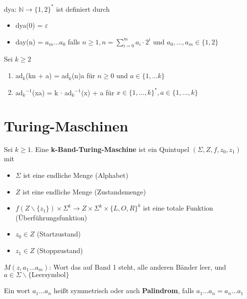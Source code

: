 \documentclass[14pt]{article}
\begin{document}
        \begin{definition}
            dya: $\mathbb{N} \rightarrow \{ 1, 2\}^*$ ist definiert durch
            \begin{itemize}
                \item dya(0) = $\varepsilon$
                \item day(n) = $a_m \dots a_0$ falls $n \geq 1, n = \sum_{i = 0}^m
                a_i \cdot 2^i$ und $a_0, \dots, a_m \in \{ 1, 2 \}$
            \end{itemize}
        \end{definition}
        
        \begin{eigenschaft}
            Sei $k \geq 2$
            \begin{enumerate}
                \item ad$_k$(kn + a) = ad$_k$(n)a für $n \geq 0$ und $a \in \{ 1, \dots k\}$
                \item ad$_k$$^{-1}$(xa) = k $\cdot$ ad$_k$$^{-1}$(x) + a
                für $x \in \{ 1, \dots, k\}^*, a \in \{ 1, \dots, k \}$
            \end{enumerate}
        \end{eigenschaft}

    \section{Turing-Maschinen}
        \begin{definition}
            Sei $k \geq 1$. Eine \textbf{k-Band-Turing-Maschine} ist 
            ein Quintupel $(\varSigma, Z, f, z_0, z_1)$ mit 
            \begin{itemize}
                \item $\varSigma$ ist eine endliche Menge (Alphabet)
                \item $Z$ ist eine endliche Menge (Zustandsmenge)
                \item $f(Z \backslash \{ z_1\}) \times \varSigma^k \rightarrow
                Z \times \varSigma^k \times \{ L, O, R \}^k$ ist eine totale Funktion
                (Überführungsfunktion)
                \item $z_0 \in Z$ (Startzustand)
                \item $z_1 \in Z$ (Stoppzustand)
            \end{itemize}
            $M(z, a_1 \dots a_m)$: Wort das auf Band 1 steht, alle anderen 
            Bänder leer, und $a \in \varSigma \backslash \{ \text{Leersymbol} \}$
        \end{definition}
        \begin{definition}[Palindrom]
            Ein wort $a_1 \dots a_n$ heißt symmetrisch oder auch 
            \textbf{Palindrom}, falls $a_1 \dots a_n = a_n \dots a_1$
        \end{definition}
\end{document}
